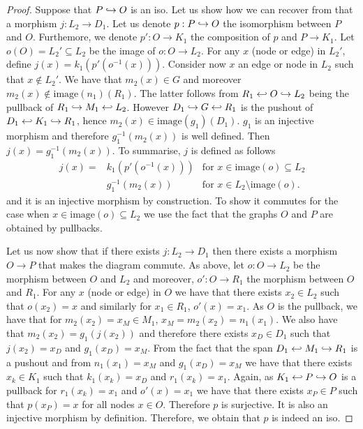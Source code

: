 \begin{proof}
    Suppose that $P\hookrightarrow O$ is an iso. Let us show how we can recover from that a morphism $j:L_2\to D_1$.
    Let us denote $p:P\hookrightarrow O$ the isomorphism between $P$ and $O$. Furthemore, we denote $p':O\to K_1$ the composition of $p$ and $P\to K_1$.
    Let $o(O) =L_2'\subseteq L_2$ be the image of $o:O\to L_2$. For any $x$ (node or edge) in $L_2'$, define $j(x) = k_1(p'(o^{-1}(x)))$. Consider now $x$ an edge or node in $L_2$ such that $x\notin L_2'$. We have that $m_2(x)\in G$ and moreover $m_2(x)\notin\text{image}(n_1)(R_1)$. The latter follows from $R_1 \hookleftarrow O\hookrightarrow L_2$ being the pullback of $R_1\hookrightarrow M_1\hookleftarrow L_2$. However $D_1\hookrightarrow G\hookleftarrow R_1$ is the pushout of $D_1\hookleftarrow K_1\hookrightarrow R_1$, hence $m_2(x)\in\text{image}(g_1)(D_1)$. $g_1$ is an injective morphism and therefore $g_1^{-1}(m_2(x))$ is well defined. Then $j(x) = g_1^{-1}(m_2(x))$. To summarise, $j$ is defined as follows
    \begin{align*}
      j(x) =& k_1(p'(o^{-1}(x))) &\text{for }x\in\text{image}(o)\subseteq L_2\\
      & g_1^{-1}(m_2(x))&\text{for }x\in L_2\setminus\text{image}(o).
    \end{align*}
and it is an injective morphism by construction. To show it commutes for the case when $x\in\text{image}(o)\subseteq L_2$ we use the fact that the graphs $O$ and $P$ are obtained by pullbacks.

Let us now show that if there exists $j:L_2\to D_1$ then there exists a morphism $O\to P$ that makes the diagram commute. As above, let $o:O\to L_2$ be the morphism between $O$ and $L_2$ and moreover, $o':O\to R_1$ the morphism between $O$ and $R_1$.
%
For any $x$ (node or edge) in $O$ we have that there exists $x_2\in L_2$ such that $o(x_2)=x$ and similarly for $x_1\in R_1$, $o'(x)=x_1$. As $O$ is the pullback, we have that for $m_2(x_2) = x_M\in M_1$, $x_M = m_2(x_2) = n_1(x_1)$.
We also have that $m_2(x_2)=g_1(j(x_2))$ and therefore there exists $x_D\in D_1$ such that $j(x_2)=x_D$ and $g_1(x_D)=x_M$. From the fact that the span $D_1\hookleftarrow M_1\hookrightarrow R_1$ is a pushout and from $n_1(x_1)=x_M$ and $g_1(x_D)=x_M$ we have that there exists $x_k\in K_1$ such that $k_1(x_k) = x_D$ and $r_1(x_k)=x_1$. Again, as $K_1\hookleftarrow P \hookrightarrow O$ is a pullback for $r_1(x_k)=x_1$ and $o'(x)=x_1$ we have that there exists $x_P\in P$ such that $p(x_P)=x$ for all nodes $x\in O$. Therefore $p$ is surjective. It is also an injective morphism by definition. Therefore, we obtain that $p$ is indeed an iso.
 \end{proof}


